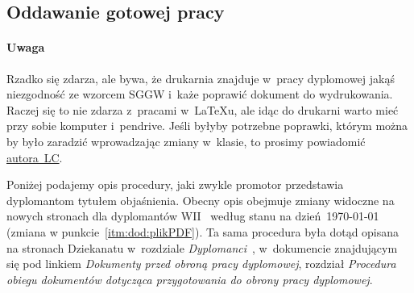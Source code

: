 \subsection{Oddawanie gotowej pracy}
\label{sec:dod:oddawanie}


\paragraph{Uwaga} Rzadko się zdarza, ale bywa, że drukarnia znajduje w~pracy dyplomowej jakąś niezgodność ze wzorcem SGGW i~każe poprawić dokument do wydrukowania. Raczej się to nie zdarza z~pracami w~\LaTeX{}u, ale idąc do drukarni warto mieć przy sobie komputer i~pendrive. Jeśli byłyby potrzebne  poprawki, którym można by było zaradzić wprowadzając zmiany w~klasie, to prosimy powiadomić \hyperref[sec:dod:dodatek]{autora~LC}. 

Poniżej podajemy opis procedury, jaki zwykle promotor przedstawia dyplomantom tytułem objaśnienia. Obecny opis obejmuje zmiany widoczne na nowych stronach dla dyplomantów WII~ według stanu na dzień~\today{} (zmiana w punkcie~\ref{itm:dod:plikPDF}). Ta sama procedura była dotąd opisana na stronach Dziekanatu w~rozdziale {\em Dyplomanci}~, w~dokumencie znajdującym się pod linkiem {\em Dokumenty przed obroną pracy dyplomowej}, rozdział {\em Procedura obiegu dokumentów dotycząca przygotowania do obrony pracy dyplomowej}.


